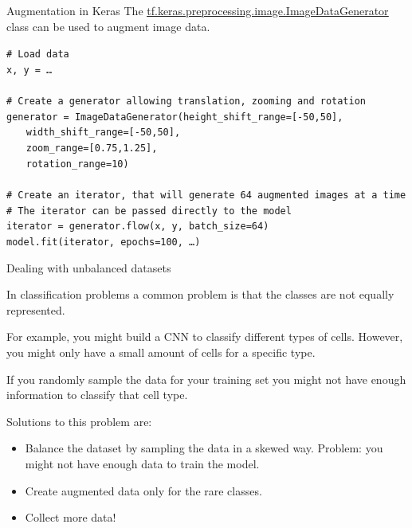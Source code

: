 \documentclass[9pt, aspectratio=169]{beamer}
\begin{document}
\begin{frame}
    {Augmentation in Keras}
    The \href{https://www.tensorflow.org/api_docs/python/tf/keras/preprocessing/image/ImageDataGenerator}{\underline{tf.keras.preprocessing.image.ImageDataGenerator}} class can be used to augment image data.

    \begin{codebox}
        \texttt{\# Load data\\
        x, y = \dots\\
        \\
        \# Create a generator allowing translation, zooming and rotation\\
        generator = ImageDataGenerator(height\_shift\_range=[-50,50],\\
        $~~~~~~~~$width\_shift\_range=[-50,50],\\
        $~~~~~~~~$zoom\_range=[0.75,1.25],\\
        $~~~~~~~~$rotation\_range=10)\\
        \\
        \pause
        \# Create an iterator, that will generate 64 augmented images at a time\\
        \# The iterator can be passed directly to the model\\
        iterator = generator.flow(x, y, batch\_size=64)\\
        model.fit(iterator, epochs=100, \dots)
        }
    \end{codebox}
\end{frame}

\begin{frame}
    {Dealing with unbalanced datasets}

    In classification problems a common problem is that the classes are not equally represented.

    For example, you might build a CNN to classify different types of cells. However, you might only have a small amount of cells for a specific type.
    
    If you randomly sample the data for your training set you might not have enough information to classify that cell type.

    Solutions to this problem are:

    \begin{itemize}
        \item Balance the dataset by sampling the data in a skewed way. Problem: you might not have enough data to train the model.
        \item Create augmented data only for the rare classes.
        \item Collect more data! 
    \end{itemize}
\end{frame}
\end{document}
